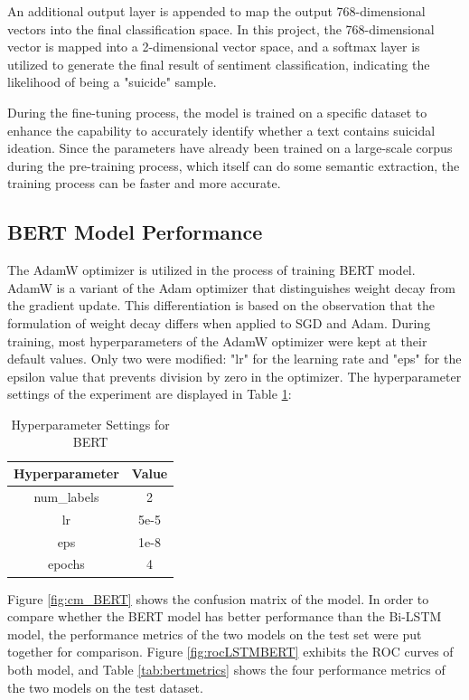 \documentclass[ %
                    author={Bocheng Wang},
                supervisor={Dr. Qiang Liu},
                    degree={MSc},
                     title={A Research on Identification of Suicide Ideation in Texts with Multiple Models},
                      type={},
                      year={2024}]{dissertation}
\begin{document}
An additional output layer is appended to map the output 768-dimensional vectors into the final classification space. In this project, the 768-dimensional vector is mapped into a 2-dimensional vector space, and a softmax layer is utilized to generate the final result of sentiment classification, indicating the likelihood of being a "suicide" sample.

During the fine-tuning process, the model is trained on a specific dataset to enhance the capability to accurately identify whether a text contains suicidal ideation. Since the parameters have already been trained on a large-scale corpus during the pre-training process, which itself can do some semantic extraction, the training process can be faster and more accurate.

\subsection{BERT Model Performance}
\noindent
The AdamW optimizer\cite{loshchilov2019decoupled} is utilized in the process of training BERT model. AdamW is a variant of the Adam optimizer that distinguishes weight decay from the gradient update. This differentiation is based on the observation that the formulation of weight decay differs when applied to SGD and Adam. During training, most hyperparameters of the AdamW optimizer were kept at their default values. Only two were modified: "lr" for the learning rate and "eps" for the epsilon value that prevents division by zero in the optimizer. The hyperparameter settings of the experiment are displayed in Table \ref{tab:berthyperparameter}:

\begin{table}[h]
      \centering
      \begin{tabular}{cc}
            \hline
            Hyperparameter & Value \\
            \hline
            num\_labels & 2      \\
            lr          & 5e-5   \\
            eps         & 1e-8   \\
            epochs      & 4      \\
            \hline
      \end{tabular}
      \caption{Hyperparameter Settings for BERT}
      \label{tab:berthyperparameter}
\end{table}

Figure \ref{fig:cm_BERT} shows the confusion matrix of the model. In order to compare whether the BERT model has better performance than the Bi-LSTM model, the performance metrics of the two models on the test set were put together for comparison. Figure \ref{fig:rocLSTMBERT} exhibits the ROC curves of both model, and Table \ref{tab:bertmetrics} shows the four performance metrics of the two models on the test dataset. 
\end{document}
